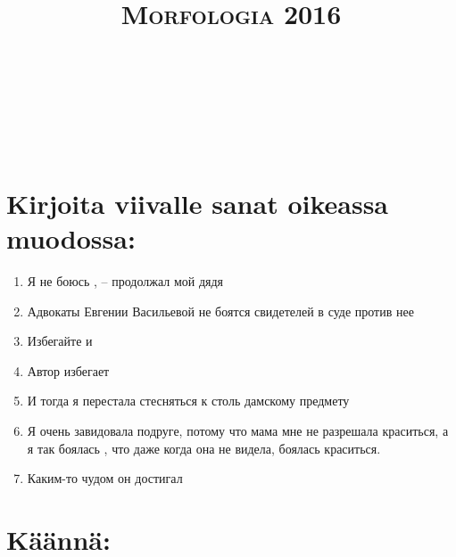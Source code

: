 \documentclass[paper=a4, fontsize=11pt]{scrartcl}
\title{	
\normalfont \normalsize 
\textsc{Morfologia 2016} \\ [25pt] 
\horrule{0.5pt} \\[0.4cm] 
\huge  \\ 
\horrule{2pt} \\[0.5cm] 
}
\date{}
\begin{document}
\onehalfspacing

\section{Kirjoita viivalle sanat oikeassa muodossa:}

\begin{enumerate}
    \item Я не боюсь \raisebox{-\baselineskip}{\shortstack{\underline{\hspace{3cm}}\\kuolema}} , -- продолжал мой дядя
    \item Адвокаты Евгении Васильевой не боятся   свидетелей в суде против нее
    \item Избегайте  и  
    \item Автор избегает   
    \item И тогда я перестала стесняться \raisebox{-\baselineskip}{\shortstack{\underline{\hspace{3cm}}\\kiinnostukseni}}  к столь дамскому предмету
    \item Я очень завидовала подруге, потому что мама мне не разрешала краситься, а я так боялась , что даже когда она не видела, боялась краситься.
    \item Каким-то чудом он достигал\raisebox{-\baselineskip}{\shortstack{\underline{\hspace{3cm}}\\tasapaino}}  
\end{enumerate}

\section{Käännä:}
\end{document}
